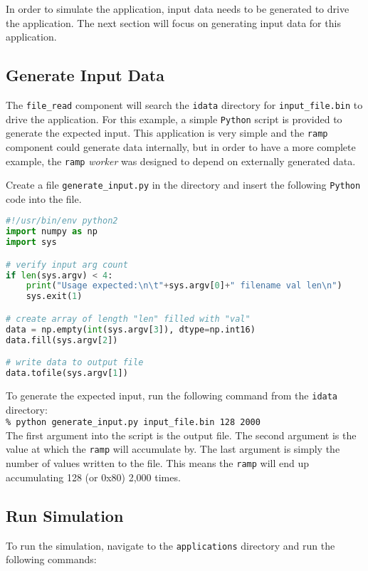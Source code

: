 In order to simulate the application, input data needs to be generated to drive the application. The next section will focus on generating input data for this application.

\subsection{Generate Input Data}
The \verb+file_read+ component will search the \verb+idata+ directory for \verb+input_file.bin+ to drive the application. For this example, a simple \verb+Python+ script is provided to generate the expected input. This application is very simple and the \verb+ramp+ component could generate data internally, but in order to have a more complete example, the \verb+ramp+ \textit{worker} was designed to depend on externally generated data. \newline

Create a file \verb+generate_input.py+ in the  directory and insert the following \verb+Python+ code into the file.
\begin{lstlisting}[language=python]
#!/usr/bin/env python2
import numpy as np
import sys

# verify input arg count
if len(sys.argv) < 4:
    print("Usage expected:\n\t"+sys.argv[0]+" filename val len\n")
    sys.exit(1)

# create array of length "len" filled with "val"
data = np.empty(int(sys.argv[3]), dtype=np.int16)
data.fill(sys.argv[2])

# write data to output file
data.tofile(sys.argv[1])
\end{lstlisting}

To generate the expected input, run the following command from the \verb+idata+ directory:\\

\forceindent\verb+% python generate_input.py input_file.bin 128 2000+\\

The first argument into the script is the output file. The second argument is the value at which the \verb+ramp+ will accumulate by. The last argument is simply the number of values written to the file. This means the \verb+ramp+ will end up accumulating 128 (or 0x80) 2,000 times.

\subsection{Run Simulation}
\label{example:run}
\bstart
To run the simulation, navigate to the \verb+applications+ directory and run the following commands:\\

